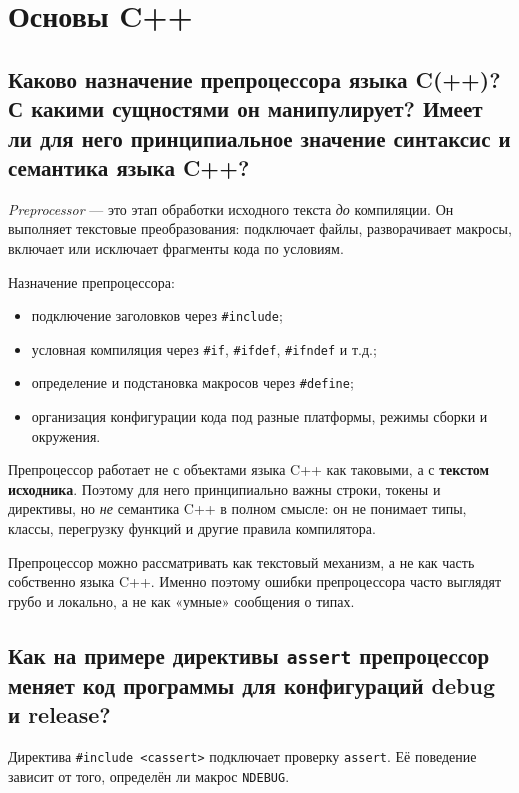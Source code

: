 \section{Основы C++}

\subsection{Каково назначение препроцессора языка C(++)? С какими сущностями он манипулирует? Имеет ли для него принципиальное значение синтаксис и семантика языка C++?}
\begin{definition}[Препроцессор]
\textit{Preprocessor} — это этап обработки исходного текста \emph{до} компиляции. Он выполняет текстовые преобразования: подключает файлы, разворачивает макросы, включает или исключает фрагменты кода по условиям.
\end{definition}

Назначение препроцессора:
\begin{itemize}
    \item подключение заголовков через \texttt{\#include};
    \item условная компиляция через \texttt{\#if}, \texttt{\#ifdef}, \texttt{\#ifndef} и т.д.;
    \item определение и подстановка макросов через \texttt{\#define};
    \item организация конфигурации кода под разные платформы, режимы сборки и окружения.
\end{itemize}

Препроцессор работает не с объектами языка C++ как таковыми, а с \textbf{текстом исходника}. Поэтому для него принципиально важны строки, токены и директивы, но \emph{не} семантика C++ в полном смысле: он не понимает типы, классы, перегрузку функций и другие правила компилятора.

\begin{remark}
Препроцессор можно рассматривать как текстовый механизм, а не как часть собственно языка C++. Именно поэтому ошибки препроцессора часто выглядят грубо и локально, а не как «умные» сообщения о типах.
\end{remark}

\subsection{Как на примере директивы \texttt{assert} препроцессор меняет код программы для конфигураций debug и release?}
Директива \texttt{\#include <cassert>} подключает проверку \texttt{assert}. Её поведение зависит от того, определён ли макрос \texttt{NDEBUG}.

